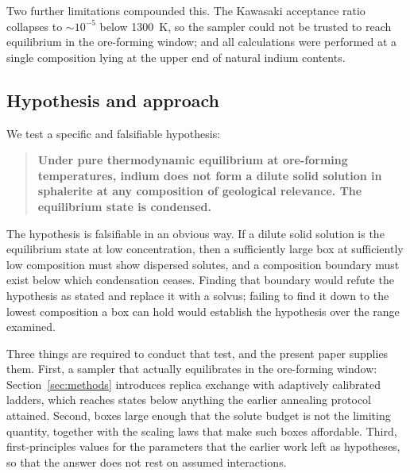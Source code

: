 \documentclass[11pt,a4paper]{article}
\begin{document}
Two further limitations compounded this. The Kawasaki acceptance ratio collapses
to $\sim10^{-5}$ below 1300~K, so the sampler could not be trusted to reach
equilibrium in the ore-forming window; and all calculations were performed at a
single composition lying at the upper end of natural indium contents.

\subsection{Hypothesis and approach}

We test a specific and falsifiable hypothesis:

\begin{quote}
\textbf{Under pure thermodynamic equilibrium at ore-forming temperatures, indium
does not form a dilute solid solution in sphalerite at any composition of
geological relevance. The equilibrium state is condensed.}
\end{quote}

The hypothesis is falsifiable in an obvious way. If a dilute solid solution is
the equilibrium state at low concentration, then a sufficiently large box at
sufficiently low composition must show dispersed solutes, and a composition
boundary must exist below which condensation ceases. Finding that boundary would
refute the hypothesis as stated and replace it with a solvus; failing to find it
down to the lowest composition a box can hold would establish the hypothesis
over the range examined.

Three things are required to conduct that test, and the present paper supplies
them. First, a sampler that actually equilibrates in the ore-forming window:
Section~\ref{sec:methods} introduces replica exchange with adaptively calibrated
ladders, which reaches states below anything the earlier annealing protocol
attained. Second, boxes large enough that the solute budget is not the limiting
quantity, together with the scaling laws that make such boxes affordable.
Third, first-principles values for the parameters that the earlier work left as
hypotheses, so that the answer does not rest on assumed interactions.
\end{document}
